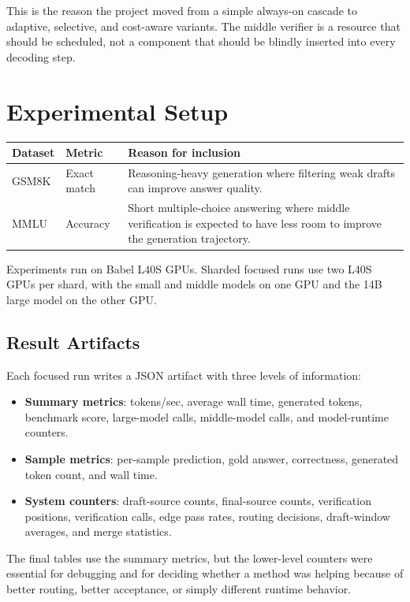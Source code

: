 \documentclass[11pt]{article}
\begin{document}
This is the reason the project moved from a simple always-on cascade to adaptive, selective, and cost-aware variants. The middle verifier is a resource that should be scheduled, not a component that should be blindly inserted into every decoding step.

\section{Experimental Setup}

\begin{center}
\begin{tabular}{lll}
\toprule
Dataset & Metric & Reason for inclusion \\
\midrule
GSM8K & Exact match & Reasoning-heavy generation where filtering weak drafts can improve answer quality. \\
MMLU & Accuracy & Short multiple-choice answering where middle verification is expected to have less room to improve the generation trajectory. \\
\bottomrule
\end{tabular}
\end{center}

Experiments run on Babel L40S GPUs. Sharded focused runs use two L40S GPUs per shard, with the small and middle models on one GPU and the 14B large model on the other GPU.

\subsection{Result Artifacts}

Each focused run writes a JSON artifact with three levels of information:

\begin{itemize}
  \item \textbf{Summary metrics}: tokens/sec, average wall time, generated tokens, benchmark score, large-model calls, middle-model calls, and model-runtime counters.
  \item \textbf{Sample metrics}: per-sample prediction, gold answer, correctness, generated token count, and wall time.
  \item \textbf{System counters}: draft-source counts, final-source counts, verification positions, verification calls, edge pass rates, routing decisions, draft-window averages, and merge statistics.
\end{itemize}

The final tables use the summary metrics, but the lower-level counters were essential for debugging and for deciding whether a method was helping because of better routing, better acceptance, or simply different runtime behavior.
\end{document}
